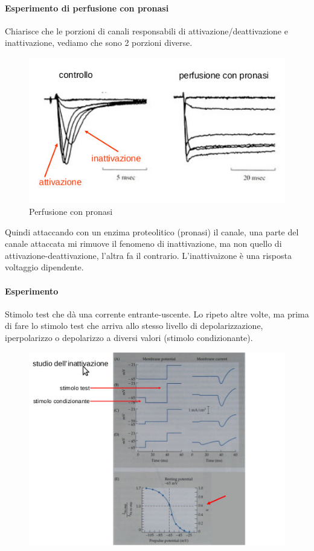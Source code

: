 \documentclass[a4paper,12pt]{article}
\begin{document}
\paragraph{Esperimento di perfusione con pronasi }
Chiarisce che le porzioni di canali responsabili di attivazione/deattivazione e inattivazione, vediamo che sono 2 porzioni diverse.

\begin{figure}[H]
\centering
\includegraphics[scale=0.4]{immagine/pronasi.jpg}
\caption{Perfusione con pronasi}
\end{figure}
Quindi attaccando con un enzima proteolitico (pronasi) il canale, una parte del canale attaccata mi rimuove il fenomeno di inattivazione, ma non quello di attivazione-deattivazione, l'altra fa il contrario.
L'inattivaizone è una risposta voltaggio dipendente.

\paragraph{Esperimento}
Stimolo test che dà una corrente entrante-uscente. Lo ripeto altre volte, ma prima di fare lo stimolo test che arriva allo stesso livello di depolarizzazione, iperpolarizzo o depolarizzo a diversi valori (stimolo condizionante). 

\begin{figure}[H]
\centering
\includegraphics[scale=0.6]{immagine/inatt.jpg}
\end{figure}
\end{document}
